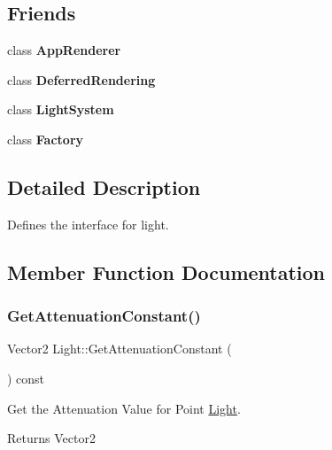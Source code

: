 \subsection*{Friends}
\begin{DoxyCompactItemize}
\item 
\mbox{\label{classLight_a5f3d064e51c4a3bf9409801632b9a7af}} 
class {\bfseries App\+Renderer}
\item 
\mbox{\label{classLight_a355bf32616f2e1751ee46bd315e905e5}} 
class {\bfseries Deferred\+Rendering}
\item 
\mbox{\label{classLight_acad5260b1bd2b9cbfe38d8f2471f072b}} 
class {\bfseries Light\+System}
\item 
\mbox{\label{classLight_a328c093d609680cca505905c6d49901a}} 
class {\bfseries Factory}
\end{DoxyCompactItemize}


\subsection{Detailed Description}
Defines the interface for light. 

\subsection{Member Function Documentation}
\mbox{\label{classLight_abf1be47f811217845e2381fd01e01c6d}} 
\subsubsection{\texorpdfstring{Get\+Attenuation\+Constant()}{GetAttenuationConstant()}}
{\footnotesize\ttfamily Vector2 Light\+::\+Get\+Attenuation\+Constant (\begin{DoxyParamCaption}{ }\end{DoxyParamCaption}) const}



Get the Attenuation Value for Point \hyperlink{classLight}{Light}. 

\begin{DoxyReturn}{Returns}
Vector2 
\end{DoxyReturn}
\mbox{\label{classLight_aff03e46ab768fd30fae4e9624532351a}} 

